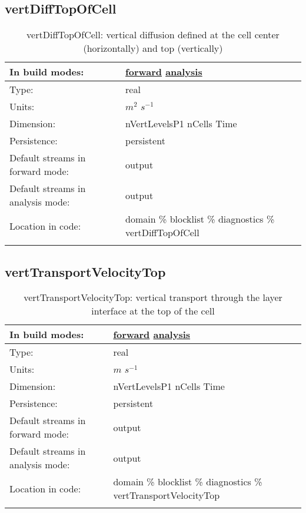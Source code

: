 \subsection[vertDiffTopOfCell]{vertDiffTopOfCell}
\label{subsec:var_sec_diagnostics_vertDiffTopOfCell}
\begin{center}
\begin{longtable}{| p{2.0in} | p{4.0in} |}
        \hline 
        In build modes: & \hyperref[subsec:forward_var_tab_diagnostics]{forward} \hyperref[subsec:analysis_var_tab_diagnostics]{analysis} \\
        \hline 
        Type: & real \\
        \hline 
        Units: & $m^2$ $s^{-1}$ \\
        \hline 
        Dimension: & nVertLevelsP1 nCells Time \\
        \hline 
        Persistence: & persistent \\
        \hline 
		 Default streams in forward mode: &  output \\
        \hline 
		 Default streams in analysis mode: &  output \\
        \hline 
		 Location in code: & domain \% blocklist \% diagnostics \% vertDiffTopOfCell \\
		 \hline 
    \caption{vertDiffTopOfCell: vertical diffusion defined at the cell center (horizontally) and top (vertically)}
\end{longtable}
\end{center}
\subsection[vertTransportVelocityTop]{vertTransportVelocityTop}
\label{subsec:var_sec_diagnostics_vertTransportVelocityTop}
\begin{center}
\begin{longtable}{| p{2.0in} | p{4.0in} |}
        \hline 
        In build modes: & \hyperref[subsec:forward_var_tab_diagnostics]{forward} \hyperref[subsec:analysis_var_tab_diagnostics]{analysis} \\
        \hline 
        Type: & real \\
        \hline 
        Units: & $m$ $s^{-1}$ \\
        \hline 
        Dimension: & nVertLevelsP1 nCells Time \\
        \hline 
        Persistence: & persistent \\
        \hline 
		 Default streams in forward mode: &  output \\
        \hline 
		 Default streams in analysis mode: &  output \\
        \hline 
		 Location in code: & domain \% blocklist \% diagnostics \% vertTransportVelocityTop \\
		 \hline 
    \caption{vertTransportVelocityTop: vertical transport through the layer interface at the top of the cell}
\end{longtable}
\end{center}
